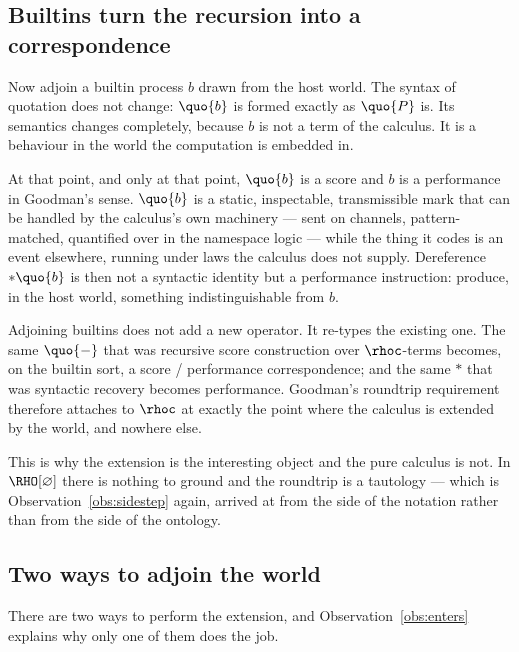 \subsection{Builtins turn the recursion into a correspondence}
\label{sec:turn-of-operators}

Now adjoin a builtin process $b$ drawn from the host world.
The syntax of quotation does not change: $\quo{b}$ is formed
exactly as $\quo{P}$ is.
Its semantics changes completely, because $b$ is not a term of the
calculus.
It is a behaviour in the world the computation is embedded in.

At that point, and only at that point, $\quo{b}$ is a score and $b$
is a performance in Goodman's sense.
$\quo{b}$ is a static, inspectable, transmissible mark that can be
handled by the calculus's own machinery --- sent on channels,
pattern-matched, quantified over in the namespace logic --- while
the thing it codes is an event elsewhere, running under laws the
calculus does not supply.
Dereference $*\quo{b}$ is then not a syntactic identity but a
performance instruction: produce, in the host world, something
indistinguishable from $b$.

\begin{observation}
\label{obs:enters}
Adjoining builtins does not add a new operator.
It re-types the existing one.
The same $\quo{-}$ that was recursive score construction over
$\rhoc$-terms becomes, on the builtin sort, a score / performance
correspondence; and the same $*$ that was syntactic recovery
becomes performance.
Goodman's roundtrip requirement therefore attaches to $\rhoc$ at
exactly the point where the calculus is extended by the world, and
nowhere else.
\end{observation}

\noindent
This is why the extension is the interesting object and the pure
calculus is not.
In $\RHO[\varnothing]$ there is nothing to ground and the roundtrip
is a tautology --- which is Observation~\ref{obs:sidestep} again,
arrived at from the side of the notation rather than from the side
of the ontology.

\subsection{Two ways to adjoin the world}
\label{sec:two-ways}

There are two ways to perform the extension, and
Observation~\ref{obs:enters} explains why only one of them does the
job.

